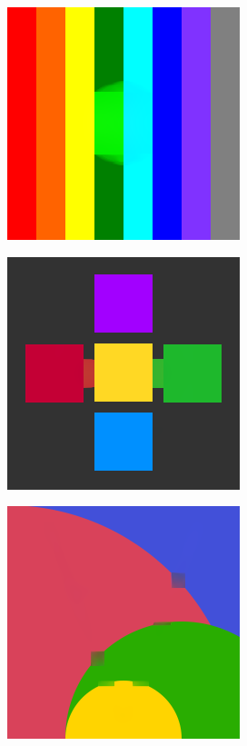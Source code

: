 \documentclass[xcolor=dvipsnames, xetex,serif]{beamer}
\numberwithin{equation}{section}
\begin{document}
\begin{frame}
\begin{figure}[H]
				\vspace{1cm}
				\begin{subfigure}{0.3\linewidth}
					\centering
					\includegraphics[width=0.7\linewidth]{images/result_ex1/splitbergman03.png}
				\end{subfigure}
				\begin{subfigure}{0.3\linewidth}
					\centering
					\includegraphics[width=0.7\linewidth]{images/result_ex1/splitbergman04.png}
				\end{subfigure}
				\begin{subfigure}{0.3\linewidth}
					\centering
					\includegraphics[width=0.7\linewidth]{images/result_ex1/splitbergman05.png}

\end{subfigure}
\end{figure}
\end{frame}
\end{document}

